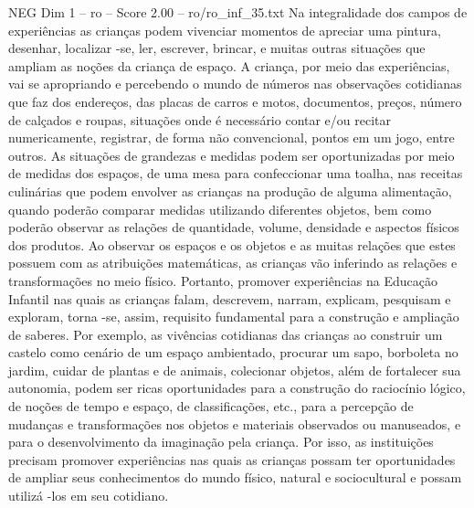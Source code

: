 \begin{textsample}{NEG Dim 1 – ro – Score 2.00 – ro/ro\_inf\_35.txt}
Na integralidade dos campos de experiências as crianças podem vivenciar momentos de apreciar uma pintura, desenhar, localizar -se, ler, escrever, brincar, e muitas outras situações que ampliam as noções da criança de espaço.
A criança, por meio das experiências, vai se apropriando e percebendo o mundo de números nas observações cotidianas que faz dos endereços, das placas de carros e motos, documentos, preços, número de calçados e roupas, situações onde é necessário contar e/ou recitar numericamente, registrar, de forma não convencional, pontos em um jogo, entre outros.
As situações de grandezas e medidas podem ser oportunizadas por meio de medidas dos espaços, de uma mesa para confeccionar uma toalha, nas receitas culinárias que podem envolver as crianças na produção de alguma alimentação, quando poderão comparar medidas utilizando diferentes objetos, bem como poderão observar as relações de quantidade, volume, densidade e aspectos físicos dos produtos.
Ao observar os espaços e os objetos e as muitas relações que estes possuem com as atribuições matemáticas, as crianças vão inferindo as relações e transformações no meio físico.
Portanto, promover experiências na Educação Infantil nas quais as crianças falam, descrevem, narram, explicam, pesquisam e exploram, torna -se, assim, requisito fundamental para a construção e ampliação de saberes.
Por exemplo, as vivências cotidianas das crianças ao construir um castelo como cenário de um espaço ambientado, procurar um sapo, borboleta no jardim, cuidar de plantas e de animais, colecionar objetos, além de fortalecer sua autonomia, podem ser ricas oportunidades para a construção do raciocínio lógico, de noções de tempo e espaço, de classificações, etc., para a percepção de mudanças e transformações nos objetos e materiais observados ou manuseados, e para o desenvolvimento da imaginação pela criança.
Por isso, as instituições precisam promover experiências nas quais as crianças possam ter oportunidades de ampliar seus conhecimentos do mundo físico, natural e sociocultural e possam utilizá -los em seu cotidiano.

\end{textsample}
